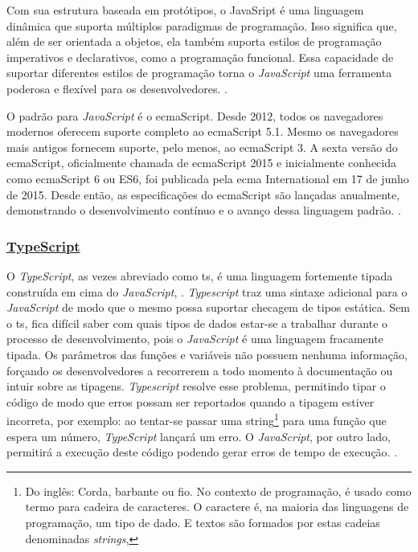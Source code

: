 Com sua estrutura baseada em protótipos, o JavaSript é uma linguagem dinâmica que
suporta múltiplos paradigmas de programação. Isso significa que, além de ser orientada a
objetos, ela também suporta estilos de programação imperativos e declarativos, como a
programação funcional. Essa capacidade de suportar diferentes estilos de programação torna o
\textit{JavaScript} uma ferramenta poderosa e flexível para os desenvolvedores.
\cite{mdn-js}.

O padrão para \textit{JavaScript} é o
\acrshort{ecma}Script.
Desde 2012, todos os navegadores
modernos oferecem suporte completo ao
\acrshort{ecma}Script 5.1. Mesmo os navegadores mais
antigos fornecem suporte, pelo menos, ao
\acrshort{ecma}Script 3. A sexta versão do
\acrshort{ecma}Script,
oficialmente chamada de
\acrshort{ecma}Script 2015 e inicialmente conhecida como
\acrshort{ecma}Script 6
ou ES6, foi publicada pela \acrshort{ecma} International
em 17 de junho de 2015. Desde então, as
especificações do
\acrshort{ecma}Script são lançadas anualmente, demonstrando o desenvolvimento
contínuo e o avanço dessa linguagem padrão.
\cite{mdn-js}.

\subsubsection{\underline{TypeScript}}

O \textit{TypeScript}, as vezes abreviado como
\acrshort{ts}, é uma linguagem fortemente
tipada construída em cima do \textit{JavaScript},
\cite{ts-page}.
\textit{Typescript} traz uma sintaxe adicional para o \textit{JavaScript} de modo
que o mesmo possa suportar checagem de tipos estática.
Sem o \acrshort{ts},
fica difícil saber com quais tipos de dados estar-se a trabalhar
durante o processo de desenvolvimento, pois o \textit{JavaScript} é uma
linguagem fracamente tipada. Os parâmetros das funções e variáveis
não possuem nenhuma informação, forçando os desenvolvedores
a recorrerem a todo momento à documentação ou intuir sobre
as tipagens.
\textit{Typescript} resolve esse problema, permitindo tipar o código
de modo que erros possam ser reportados quando a tipagem estiver
incorreta, por exemplo: ao tentar-se passar uma
string\footnote{Do inglês: Corda, barbante ou fio. No contexto de programação,
    é usado como termo para cadeira de caracteres. O caractere é, na
    maioria das linguagens de programação, um tipo de dado. E textos
    são formados por estas cadeias denominadas \textit{strings},
}
para uma função que espera um número, \textit{TypeScript} lançará um erro.
O \textit{JavaScript}, por outro lado, permitirá a execução deste código
podendo gerar erros de tempo de execução.
\cite{ts-w3}.


